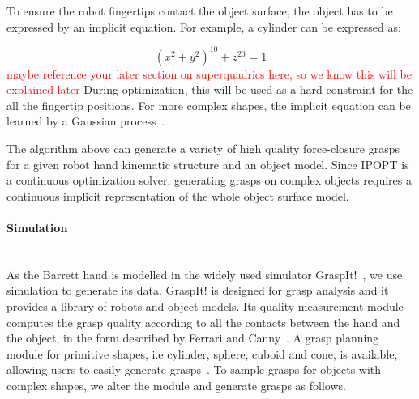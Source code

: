 To ensure the robot fingertips contact the object surface, the object has to be expressed by an implicit equation. For example, a cylinder can be expressed as:

\begin{equation}
{\left(x^2+y^2\right)}^{10}+z^{20} = 1
 \label{equ:cylinder}
\end{equation}
\textcolor{red}{maybe reference your later section on superquadrics here, so we know this will be explained later}
During optimization, this will be used as a hard constraint for the all the fingertip positions.
For more complex shapes, the implicit equation can be learned by a Gaussian process~\citep{el2013generation}.

The algorithm above can generate a variety of high quality force-closure grasps for a given robot hand kinematic structure and an object model. Since IPOPT is a continuous optimization solver, generating grasps on complex objects requires a continuous implicit representation of the whole object surface model.




\paragraph{Simulation}
~\\
As the Barrett hand is modelled in the widely used simulator GraspIt!~\citep{miller2004graspit}, we use simulation to generate its data. GraspIt! is designed for grasp analysis and it provides a library of robots and object models. Its quality measurement module computes the grasp quality according to all the contacts between the hand and the object, in the form described by Ferrari and Canny~\citep{ferrari1992planning}. A grasp planning module for primitive shapes, i.e cylinder, sphere, cuboid and cone, is available, allowing users to easily generate grasps~\citep{miller2003automatic}.
To sample grasps for objects with complex shapes, we alter the module and generate grasps as follows.

